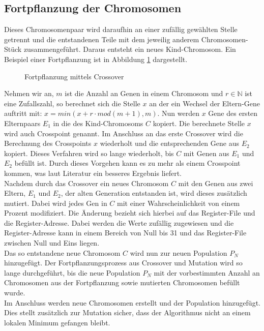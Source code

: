 \subsection{Fortpflanzung der Chromosomen}
Dieses Chromosomenpaar wird daraufhin an einer zufällig gewählten Stelle getrennt und die entstandenen Teile mit dem jeweilig anderem Chromosomen-Stück zusammengeführt. Daraus entsteht ein neues Kind-Chromosom. Ein Beispiel einer Fortpflanzung ist in Abbildung \ref{fig:crossover} dargestellt.
\begin{figure}[H] 
	\centering
	
	\caption{Fortpflanzung mittels Crossover}
	\label{fig:crossover}
\end{figure}
Nehmen wir an, $m$ ist die Anzahl an Genen in einem Chromosom und $r \in \mathbb{N}$ ist eine Zufallszahl, so berechnet sich die Stelle $x$ an der ein Wechsel der Eltern-Gene auftritt mit: $x= min(x+r\cdot mod(m+1),m)$. Nun werden $x$ Gene des ersten Elternpaars $E_1$ in die des Kind-Chromosoms $C$ kopiert. Die berechnete Stelle $x$ wird auch Crosspoint genannt. Im Anschluss an das erste Crossover wird die Berechnung des Crosspoints $x$ wiederholt und die entsprechenden Gene aus $E_2$ kopiert. Dieses Verfahren wird so lange wiederholt, bis $C$ mit Genen aus $E_1$ und $E_2$ befüllt ist. Durch dieses Vorgehen kann es zu mehr als einem Crosspoint kommen, was laut Literatur ein besseres Ergebnis liefert.\cite{reeves2003genetic} \\
Nachdem durch das Crossover ein neues Chromosom $C$ mit den Genen aus zwei Eltern, $E_1$ und $E_2$, der alten Generation entstanden ist, wird dieses zusätzlich mutiert. Dabei wird jedes Gen in $C$ mit einer Wahrscheinlichkeit von einem Prozent modifiziert. Die Änderung bezieht sich hierbei auf das Register-File und die Register-Adresse. Dabei werden die Werte zufällig zugewiesen und die Register-Adresse kann in einem Bereich von Null bis 31 und das Register-File zwischen Null und Eins liegen.\\
Das so entstandene neue Chromosom $C$ wird nun zur neuen Population $P_N$ hinzugefügt. Der Fortpflanzungsprozess aus Crossover und Mutation wird so lange durchgeführt, bis die neue Population $P_N$ mit der vorbestimmten Anzahl an Chromosomen aus der Fortpflanzung sowie mutierten Chromosomen befüllt wurde.\\
Im Anschluss werden neue Chromosomen erstellt und der Population hinzugefügt. Dies stellt zusätzlich zur Mutation sicher, dass der Algorithmus nicht an einem lokalen Minimum gefangen bleibt. 

